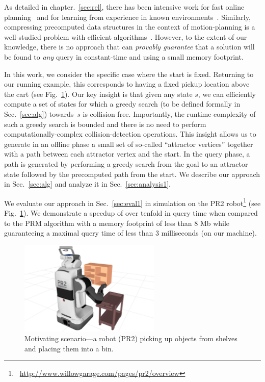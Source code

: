 \documentclass[a4paper]{report}
\begin{document}
As detailed in chapter.~\ref{sec:rel}, there has been intensive work 
for fast online planning~\cite{LA18} and 
for learning from experience in known environments~\cite{PCCL12,PDCL13,berenson2012robot,CSMOC15}.
Similarly, compressing precomputed data structures in the context of motion-planning is a well-studied problem with efficient algorithms~\cite{SSAH14,DB14}.
However, to the extent of our knowledge, there is no approach that can \emph{provably guarantee} that a solution will be found to \emph{any} query in constant-time and using a small memory footprint.


In this work, we consider the specific case where the start is fixed. Returning to our running example, this corresponds to having a fixed pickup location above the cart (see Fig.~\ref{fig:PR2}).
%
Our key insight is that given any state $s$, we can efficiently compute a set of states for which a greedy search (to be defined formally in Sec.~\ref{sec:alg}) towards~$s$ is collision free.
Importantly, the runtime-complexity of such a greedy search is bounded and there is no need to perform computationally-complex collision-detection operations. 
This insight allows us to generate in an offline phase a small set of so-called ``attractor vertices'' together with a path between each attractor vertex and the start.
In the query phase, a path is generated by performing a greedy search from the goal to an attractor state followed by the precomputed path from the start.
We describe our approach in Sec.~\ref{sec:alg} and analyze it in Sec.~\ref{sec:analysis1}.


We evaluate our approach in Sec.~\ref{sec:eval1} in simulation on the PR2 robot\footnote{~\url{http://www.willowgarage.com/pages/pr2/overview}} (see Fig.~\ref{fig:PR2}).
We demonstrate a speedup of over tenfold in query time when compared to the PRM algorithm with a memory footprint of less than 8 Mb while guaranteeing a maximal query time of less than 3 milliseconds (on our machine).


\begin{figure}[tb]
  \centering
    \includegraphics[width=0.6\textwidth]{pr2.png}
  \caption{
  Motivating scenario---a robot (PR2) picking up objects from shelves and placing them into a bin.
}
    \label{fig:PR2}
\end{figure}
\end{document}

